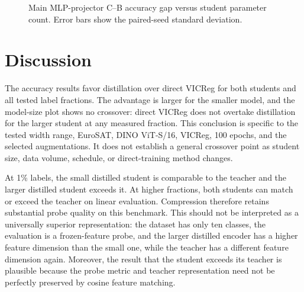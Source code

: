 \documentclass[10pt]{article}
\begin{document}
\begin{figure}[H]
\centering
{}
\caption{Main MLP-projector C--B accuracy gap versus student parameter
count. Error bars show the paired-seed standard deviation.}
\label{fig:gap}
\end{figure}

\section{Discussion}

The accuracy results favor distillation over direct VICReg for both
students and all tested label fractions. The advantage is larger for the
smaller model, and the model-size plot shows no crossover: direct VICReg
does not overtake distillation for the larger student at any measured
fraction. This conclusion is specific to the tested width range,
EuroSAT, DINO ViT-S/16, VICReg, 100 epochs, and the selected
augmentations. It does not establish a general crossover point as student
size, data volume, schedule, or direct-training method changes.

At 1\% labels, the small distilled student is comparable to the teacher
and the larger distilled student exceeds it. At higher fractions, both
students can match or exceed the teacher on linear evaluation. Compression
therefore retains substantial probe quality on this benchmark. This
should not be interpreted as a universally superior representation: the
dataset has only ten classes, the evaluation is a frozen-feature probe,
and the larger distilled encoder has a higher feature dimension than the
small one, while the teacher has a different feature dimension again.
Moreover, the result that the student exceeds its teacher is plausible
because the probe metric and teacher representation need not be perfectly
preserved by cosine feature matching.
\end{document}
